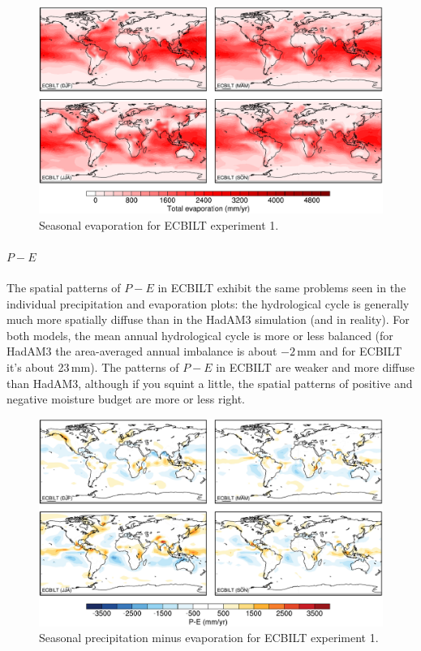 \documentclass[a4paper,11pt,article]{article}
\begin{document}
\begin{figure}
  \begin{center}
    \includegraphics[width=\textwidth]{../expt-1/plots/evap-plots}
  \end{center}
  \caption{Seasonal evaporation for ECBILT experiment 1.}
  \label{fig:evap-1}
\end{figure}

\paragraph{$P-E$}

The spatial patterns of $P-E$ in ECBILT exhibit the same problems seen
in the individual precipitation and evaporation plots: the
hydrological cycle is generally much more spatially diffuse than in
the HadAM3 simulation (and in reality).  For both models, the mean
annual hydrological cycle is more or less balanced (for HadAM3 the
area-averaged annual imbalance is about $-2$\,mm and for ECBILT it's
about 23\,mm).  The patterns of $P-E$ in ECBILT are weaker and more
diffuse than HadAM3, although if you squint a little, the spatial
patterns of positive and negative moisture budget are more or less
right.

\begin{figure}
  \begin{center}
    \includegraphics[width=\textwidth]{../expt-1/plots/pmine-plots}
  \end{center}
  \caption{Seasonal precipitation minus evaporation for ECBILT
    experiment 1.}
  \label{fig:pmine-1}
\end{figure}
\end{document}

